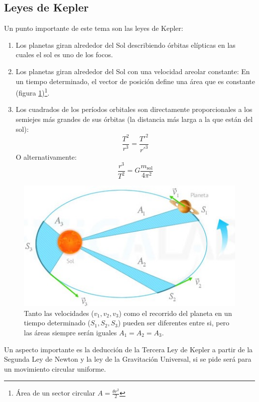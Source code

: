 \documentclass[arial,a4paper,print]{article}
\begin{document}
\subsection{Leyes de Kepler}
Un punto importante de este tema son las leyes de Kepler:
\begin{enumerate}
	\item Los planetas giran alrededor del Sol describiendo órbitas elípticas en las cuales el sol es uno de los focos.
	\item Los planetas  giran alrededor del Sol con una velocidad areolar constante: En un tiempo determinado, el vector de posición define una área que es constante (figura \ref{fig:segunda-ley-kepler})\footnote{Área de un sector circular $A=\frac{\theta r^{2}}{2}$}.
	\item Los cuadrados de los períodos orbitales son directamente proporcionales a los semiejes más grandes de sus órbitas (la distancia más larga a la que están del sol): 
	\begin{equation*}
		\frac{T^2}{r^{3}} = \frac{{T'}^2}{{r'}^{3}}
	\end{equation*}
 	O alternativamente:
 	\begin{equation*}
 		\frac{r^{3}}{T^{2}} = G\frac{m_{\text{sol}}}{4\pi^{2}}
 	\end{equation*}
\end{enumerate}

\begin{figure}
	\centering
	\includegraphics[width=0.5\linewidth]{segunda-ley-kepler}
	\caption{Tanto las velocidades ($ v_{1}, v_{2}, v_{3}$) como el recorrido del planeta en un tiempo determinado ($ S_{1}, S_{2}, S_{3}$) pueden ser diferentes entre si, pero las áreas siempre serán iguales $A_{1}=A_{2}=A_{3}$.}
	\label{fig:segunda-ley-kepler}
\end{figure}

Un aspecto importante es la deducción de la Tercera Ley de Kepler a partir de la Segunda Ley de Newton y la ley de la Gravitación Universal, si se pide será para un movimiento circular uniforme. 
\end{document}
